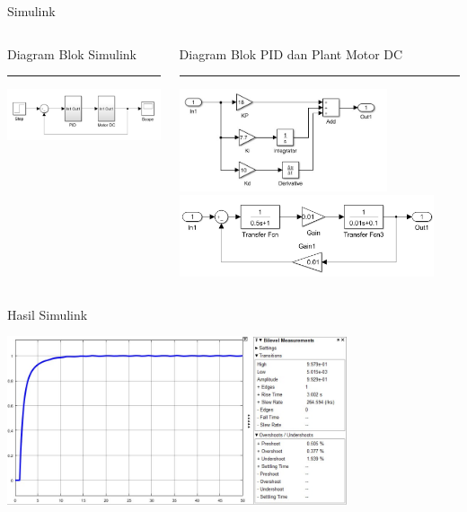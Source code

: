 \documentclass[10pt,xcolor={dvipsnames}]{beamer}
\begin{document}
\begin{frame}{Simulink}
	\begin{columns}[T] %
		\begin{column}{0.48\textwidth}
			Diagram Blok Simulink
			\color{black}\rule{\linewidth}{4pt}
			\includegraphics[width=7.5cm]{Matlab/simulink1.jpg}
		\end{column}%
		\hfill%
		\begin{column}{0.48\textwidth}
			Diagram Blok PID dan Plant Motor DC
			\color{blue}\rule{\linewidth}{4pt}
			\begin{center}
				\includegraphics[height=3cm]{Matlab/simulink2.jpg}
				\includegraphics[width=7.5cm]{Matlab/simulink3.jpg}
			\end{center}
		\end{column}
	\end{columns}
\end{frame}

\begin{frame}{ Hasil Simulink}
			\begin{center}
				\includegraphics[width=10cm]{Matlab/simulink4.jpg}
			\end{center}
		\end{frame}
\end{document}
